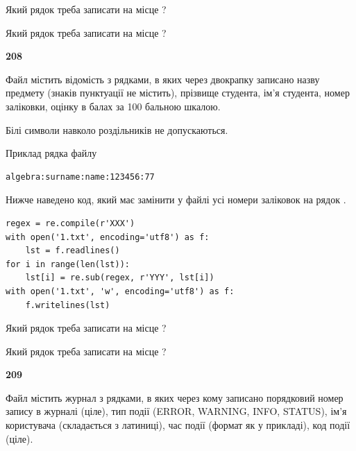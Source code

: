 Який рядок треба записати на місце  ?\par
\vspace{5mm}


Який рядок треба записати на місце  ?\par


\newpage

{\begin {center}\textbf{ 208}\end {center}}\par
Файл  містить відомість з рядками, в яких через двокрапку записа\-но назву предмету (знаків пунктуації не містить), прізвище студента, ім'я студента, номер залі\-ков\-ки, оцінку в балах за 100 бальною шкалою.

Білі символи навколо роздільників не допускаються.

Приклад рядка файлу



\begin{verbatim}
algebra:surname:name:123456:77
\end{verbatim}


Нижче наведено код, який має замінити у файлі усі номери заліковок на рядок \code{***}.



\begin{verbatim}
regex = re.compile(r'XXX')
with open('1.txt', encoding='utf8') as f:
    lst = f.readlines()
for i in range(len(lst)):
    lst[i] = re.sub(regex, r'YYY', lst[i])
with open('1.txt', 'w', encoding='utf8') as f:
    f.writelines(lst)
\end{verbatim}







Який рядок треба записати на місце  ?\par
\vspace{5mm}


Який рядок треба записати на місце  ?\par


\newpage

{\begin {center}\textbf{ 209}\end {center}}\par
Файл  містить журнал з рядками, в яких через кому записано поряд\-ко\-вий номер запису в журналі (ціле), тип події (ERROR, WARNING, INFO, STATUS), ім'я користувача (складається з латиниці), час події (фор\-мат як у прикладі), код події (ціле).

